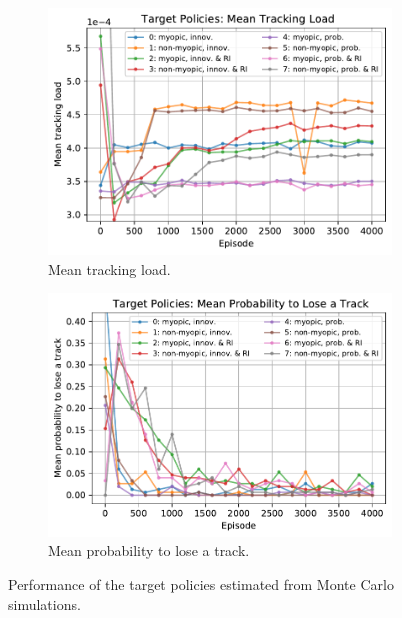 \documentclass[english, 12pt, a4paper, elec, utf8, a-1b, online]{aaltothesis}
\numberwithin{equation}{section}
\begin{document}
\begin{figure}
    \centering
    \begin{subfigure}[b]{0.8\textwidth}
        \includegraphics[width=\textwidth]{figures/benchmark/Training/offline_load.pdf}
        \caption{Mean tracking load.}
        \label{fig:offline_load}
    \end{subfigure}
    \hfill
    \begin{subfigure}[b]{0.8\textwidth}
        \includegraphics[width=\textwidth]{figures/benchmark/Training/offline_plt.pdf}
        \caption{Mean probability to lose a track.}
        \label{fig:offline_lost}
    \end{subfigure}
    \caption{
        Performance of the target policies estimated from Monte Carlo simulations.
    }
    \label{fig:offline_performance}
\end{figure}
\end{document}
